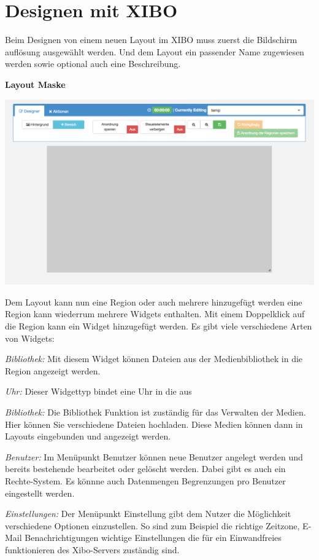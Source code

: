 \section{Designen mit XIBO}\label{sec:designexibo}
Beim Designen von einem neuen Layout im XIBO muss zuerst die Bildschirm auflösung ausgewählt werden. Und dem Layout ein passender Name zugewiesen werden sowie optional auch eine Beschreibung. 

\textbf{Layout Maske}

\begin{calendar}
	\centering
\includegraphics[width=1\textwidth]{images/xibo-basics-designer}
	\label{Calendar}
\end{calendar}	

Dem Layout kann nun eine Region oder auch mehrere  hinzugefügt werden eine Region kann wiederrum mehrere Widgets enthalten. Mit einem Doppelklick auf die Region kann ein Widget hinzugefügt werden. Es gibt viele verschiedene Arten von Widgets:

\begin{widgettypes}
	\item {\em Bibliothek:} Mit diesem Widget können Dateien aus der Medienbibliothek in die Region angezeigt werden. 

	
	\item {\em Uhr:} 
	Dieser Widgettyp bindet eine Uhr in die aus
	
	\item {\em Bibliothek:} 
	Die Bibliothek Funktion ist zuständig für das Verwalten der Medien. Hier können Sie verschiedene Dateien hochladen.  Diese Medien können dann in Layouts eingebunden und angezeigt werden.
	
	\item {\em Benutzer:} 
	Im Menüpunkt Benutzer können neue Benutzer angelegt werden und bereits bestehende bearbeitet oder gelöscht werden. Dabei gibt es auch ein Rechte-System. Es könnne auch Datenmengen Begrenzungen pro Benutzer eingestellt werden.
	
	\item {\em Einstellungen:} 
	Der Menüpunkt Einstellung gibt dem Nutzer die Möglichkeit verschiedene Optionen einzustellen. So sind zum Beispiel die richtige Zeitzone, E-Mail Benachrichtigungen wichtige Einstellungen die für ein Einwandfreies funktionieren des Xibo-Servers zuständig sind.
\end{widgettypes}

